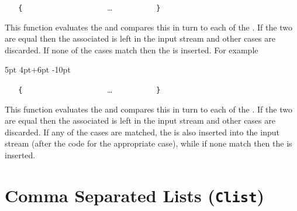 \documentclass[oneside]{book}
\begin{document}
\begin{function}{\dimCaseF}
\begin{syntax}
 
~ ~ \verb|{|
~ ~ ~ ~  
~ ~ ~ ~   
~ ~ ~ ~ \ldots
~ ~ ~ ~  
~ ~ \verb|}|
~ ~ 
\end{syntax}
This function evaluates the  and
compares this in turn to each of the
. If the two are equal then the
associated  is left in the input stream
and other cases are discarded. If none of the cases
match then the  is inserted.
For example
\begin{demohigh}
\IgnoreSpacesOn
\dimSet \lTmpaDim {5pt}
\dimCaseF {2\lTmpaDim} {
  {5pt}     {}
  {4pt+6pt} {}
  {-10pt}   {}
}{
}
\IgnoreSpacesOff
\end{demohigh}
\end{function}

\begin{function}{\dimCaseTF}
\begin{syntax}
 
~ ~ \verb|{|
~ ~ ~ ~  
~ ~ ~ ~   
~ ~ ~ ~ \ldots
~ ~ ~ ~  
~ ~ \verb|}|
~ ~ 
~ ~ 
\end{syntax}
This function evaluates the  and
compares this in turn to each of the
. If the two are equal then the
associated  is left in the input stream
and other cases are discarded. If any of the
cases are matched, the  is also inserted into the
input stream (after the code for the appropriate case), while if none
match then the  is inserted.
\end{function}

\chapter{Comma Separated Lists (\texttt{Clist})}
\end{document}
